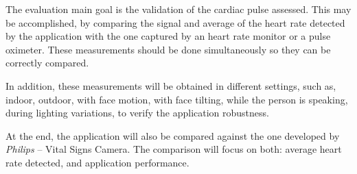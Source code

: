 The evaluation main goal is the validation of the cardiac pulse assessed.
This may be accomplished, by comparing the signal and average of the heart 
rate detected by the application with the one captured by an heart rate monitor
or a pulse oximeter. These measurements should be done simultaneously so they 
can be correctly compared.

In addition, these measurements will be obtained in different settings, 
such as, indoor, outdoor, with face motion, with face tilting, while the 
person is speaking, during lighting variations, to verify the application 
robustness.

At the end, the application will also be compared against the one developed
by \emph{Philips} -- Vital Signs Camera. The comparison will focus on both:
average heart rate detected, and application performance.

